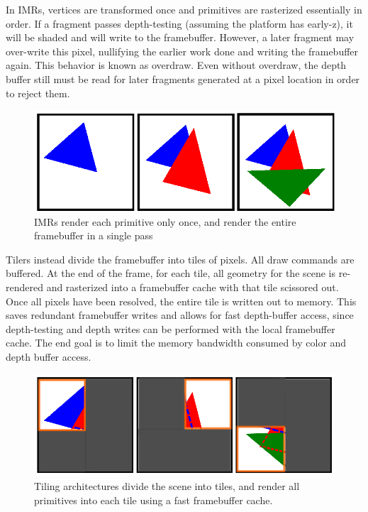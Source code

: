 In IMRs, vertices are transformed once and primitives are rasterized
essentially in order.  If a fragment passes depth-testing (assuming the
platform has early-z), it will be shaded and will write to the framebuffer.
However, a later fragment may over-write this pixel, nullifying the earlier
work done and writing the framebuffer again.  This behavior is known as overdraw.
Even without overdraw, the depth buffer still must be read for later fragments 
generated at a pixel location in order to reject them.

\begin{figure}[h!]
    \caption{IMRs render each primitive only once, and render the entire framebuffer in a single pass}
    \centering
        \includegraphics{mccaffreyFigs/IMR.eps}
\end{figure}

Tilers instead divide the framebuffer into tiles of pixels.  All draw
commands
 are buffered.  At the end of the frame, for each tile, all
geometry for the scene is re-rendered and rasterized into a framebuffer cache
with that tile scissored out.  Once all pixels have been resolved, the entire
tile is written out to memory.  This saves redundant framebuffer writes and
allows for fast depth-buffer access, since depth-testing and depth writes can
be performed with the local framebuffer cache.  The end goal is to limit the
memory bandwidth consumed by color and depth buffer access.

\begin{figure}[h!]
    \caption{Tiling architectures divide the scene into tiles, and render all primitives into each tile using a fast framebuffer cache.}
    \centering
        \includegraphics{mccaffreyFigs/tiling.eps}
\end{figure}

